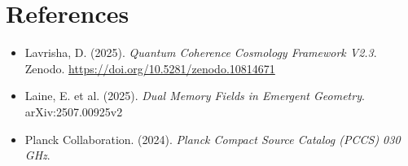 \documentclass[12pt]{article}
\begin{document}
\section*{References}
\begin{itemize}
    \item Lavrisha, D. (2025). \textit{Quantum Coherence Cosmology Framework V2.3}. Zenodo. \url{https://doi.org/10.5281/zenodo.10814671}
    \item Laine, E. et al. (2025). \textit{Dual Memory Fields in Emergent Geometry}. arXiv:2507.00925v2
    \item Planck Collaboration. (2024). \textit{Planck Compact Source Catalog (PCCS) 030 GHz}.
\end{itemize}
\end{document}
